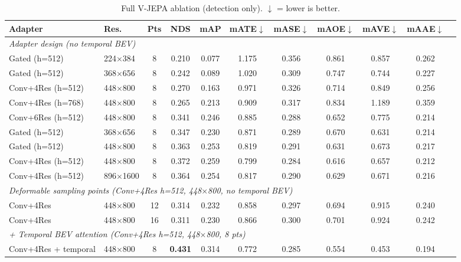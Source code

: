 \documentclass[12pt]{article}
\begin{document}
\begin{table}[h]
\centering
\caption{Full V-JEPA ablation (detection only).
  $\downarrow$ = lower is better.}
\label{tab:ablation}
\footnotesize
\setlength{\tabcolsep}{3pt}
\begin{tabular}{llccccccccc}
\toprule
\textbf{Adapter} & \textbf{Res.} & \textbf{Pts} & \textbf{NDS} & \textbf{mAP} & \textbf{mATE}$\downarrow$ & \textbf{mASE}$\downarrow$ & \textbf{mAOE}$\downarrow$ & \textbf{mAVE}$\downarrow$ & \textbf{mAAE}$\downarrow$ \\
\midrule
\multicolumn{10}{l}{\textit{Adapter design (no temporal BEV)}} \\
Gated (h=512)        & 224$\times$384  & 8  & 0.210 & 0.077 & 1.175 & 0.356 & 0.861 & 0.857 & 0.262 \\
Gated (h=512)        & 368$\times$656  & 8  & 0.242 & 0.089 & 1.020 & 0.309 & 0.747 & 0.744 & 0.227 \\
Conv+4Res (h=512)    & 448$\times$800  & 8  & 0.270 & 0.163 & 0.971 & 0.326 & 0.714 & 0.849 & 0.256 \\
Conv+4Res (h=768)    & 448$\times$800  & 8  & 0.265 & 0.213 & 0.909 & 0.317 & 0.834 & 1.189 & 0.359 \\
Conv+6Res (h=512)    & 448$\times$800  & 8  & 0.341 & 0.246 & 0.885 & 0.288 & 0.652 & 0.775 & 0.214 \\
Gated (h=512)        & 368$\times$656  & 8  & 0.347 & 0.230 & 0.871 & 0.289 & 0.670 & 0.631 & 0.214 \\
Gated (h=512)        & 448$\times$800  & 8  & 0.363 & 0.253 & 0.819 & 0.291 & 0.631 & 0.673 & 0.217 \\
Conv+4Res (h=512)    & 448$\times$800  & 8  & 0.372 & 0.259 & 0.799 & 0.284 & 0.616 & 0.657 & 0.212 \\
Conv+4Res (h=512)    & 896$\times$1600 & 8  & 0.364 & 0.254 & 0.817 & 0.290 & 0.629 & 0.671 & 0.216 \\
\midrule
\multicolumn{10}{l}{\textit{Deformable sampling points (Conv+4Res h=512, 448$\times$800, no temporal BEV)}} \\
Conv+4Res            & 448$\times$800  & 12 & 0.314 & 0.232 & 0.858 & 0.297 & 0.694 & 0.915 & 0.240 \\
Conv+4Res            & 448$\times$800  & 16 & 0.311 & 0.230 & 0.866 & 0.300 & 0.701 & 0.924 & 0.242 \\
\midrule
\multicolumn{10}{l}{\textit{+ Temporal BEV attention (Conv+4Res h=512, 448$\times$800, 8 pts)}} \\
Conv+4Res + temporal & 448$\times$800  & 8  & \textbf{0.431} & 0.314 & 0.772 & 0.285 & 0.554 & 0.453 & 0.194 \\
\bottomrule
\end{tabular}
\end{table}
 
\end{document}
